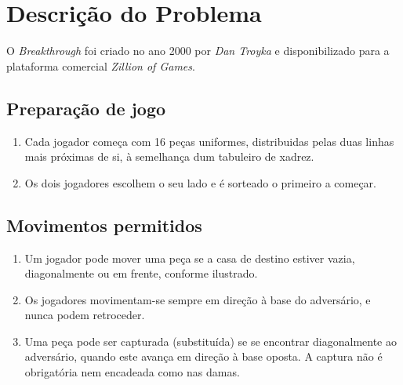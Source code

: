 \documentclass[15pt,a4paper]{article}
\begin{document}


\section{Descrição do Problema}

O \textit{Breakthrough} foi criado no ano 2000 por \textit{Dan Troyka}  e disponibilizado para a plataforma comercial \textit{Zillion of Games}.

\subsection{Preparação de jogo}
\begin{enumerate}
\item Cada jogador começa com 16 peças uniformes, distribuidas pelas duas linhas mais próximas de si, à semelhança dum tabuleiro de xadrez.
\item Os dois jogadores escolhem o seu lado e é sorteado o primeiro a começar.
\end{enumerate}

\subsection{Movimentos permitidos}
\begin{enumerate}
\item Um jogador pode mover uma peça se a casa de destino estiver vazia, diagonalmente ou em frente, conforme ilustrado.
\item Os jogadores movimentam-se sempre em direção à base do adversário, e nunca podem retroceder.
\item Uma peça pode ser capturada (substituída) se se encontrar diagonalmente ao adversário, quando este avança em direção à base oposta. A captura não é obrigatória nem encadeada como nas damas.
\end{enumerate}
\end{document}
